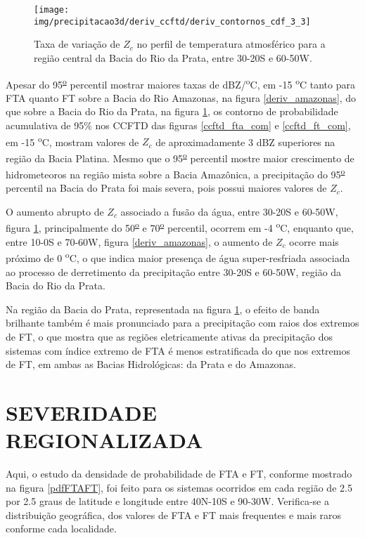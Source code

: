 \begin{figure}[!ht]
  \centering
  \texttt{[image: img/precipitacao3d/deriv\_ccftd/deriv\_contornos\_cdf\_3\_3]}
  \caption{Taxa de variação de $Z_c$ no perfil de temperatura atmosférico para a região central da Bacia do Rio da Prata, entre 30-20S e 60-50W.}
  \label{deriv_prata}  
\end{figure} 

Apesar do 95\textsuperscript{\underline{o}} percentil mostrar maiores taxas de dBZ/\textsuperscript{o}C, em -15 \textsuperscript{o}C tanto para FTA quanto FT sobre a Bacia do Rio Amazonas, na figura \ref{deriv_amazonas}, do que sobre a Bacia do Rio da Prata, na figura \ref{deriv_prata}, os contorno de probabilidade acumulativa de 95\% nos CCFTD das figuras \ref{ccftd_fta_com} e \ref{ccftd_ft_com}, em -15 \textsuperscript{o}C, mostram valores de $Z_c$ de aproximadamente 3 dBZ superiores na região da Bacia Platina. Mesmo que o 95\textsuperscript{\underline{o}} percentil mostre maior crescimento de hidrometeoros na região mista sobre a Bacia Amazônica, a precipitação do 95\textsuperscript{\underline{o}} percentil na Bacia do Prata foi mais severa, pois possui maiores valores de $Z_c$.

O aumento abrupto de $Z_c$ associado a fusão da água, entre 30-20S e 60-50W, figura \ref{deriv_prata}, principalmente do 50\textsuperscript{\underline{o}} e 70\textsuperscript{\underline{o}} percentil, ocorrem em -4 \textsuperscript{o}C, enquanto que, entre 10-0S e 70-60W, figura \ref{deriv_amazonas}, o aumento de $Z_c$ ocorre mais próximo de 0 \textsuperscript{o}C, o que indica maior presença de água super-resfriada associada ao processo de derretimento da precipitação entre 30-20S e 60-50W, região da Bacia do Rio da Prata.  

Na região da Bacia do Prata, representada na figura \ref{deriv_prata}, o efeito de banda brilhante também é mais pronunciado para a precipitação com raios dos extremos de FT, o que mostra que as regiões eletricamente ativas da precipitação dos sistemas com índice extremo de FTA é menos estratificada do que nos extremos de FT, em ambas as Bacias Hidrológicas: da Prata e do Amazonas.

\newpage
\section{SEVERIDADE REGIONALIZADA}

Aqui, o estudo da densidade de probabilidade de FTA e FT, conforme mostrado na figura \ref{pdfFTAFT}, foi feito para os sistemas ocorridos em cada região de 2.5 por 2.5 graus de latitude e longitude entre 40N-10S e 90-30W. Verifica-se a distribuição geográfica, dos valores de FTA e FT mais frequentes e mais raros conforme cada localidade.

